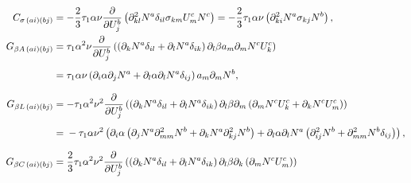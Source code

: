 \begin{align}
  C_{\sigma\, (ai)(bj)}   & = - \frac{2}{3} \tau_1 \alpha \nu \frac{\partial }{\partial U_j^b} \left( \partial_{kl}^2 N^a \delta_{il} \sigma_{km} U_m^c N^c \right) = - \frac{2}{3} \tau_1 \alpha \nu \left( \partial_{ki}^2 N^a \sigma_{kj} N^b \right), \label{eq:CSigmaLHSStabilizationTerm}                                                                       \\
  G_{\beta A \, (ai)(bj)} & = \tau_1 \alpha^2 \nu \frac{\partial }{\partial U_j^b} \left( \left( \partial_k N^a \delta_{il} + \partial_l N^a \delta_{ik} \right) \partial_l \beta a_m \partial_m N^c U_k^c \right) \notag                                                                                                                                             \\
                          & = \vphantom{\frac{\partial }{\partial U_j^b}}\tau_1 \alpha \nu \left(\partial_i \alpha \partial_j N^a + \partial_l \alpha \partial_l N^a \delta_{ij} \right) a_m \partial_m N^b, \label{eq:GBetaALHSStabilizationTerm}                                                                                                                    \\
  G_{\beta L \, (ai)(bj)} & = - \tau_1 \alpha^2 \nu^2 \frac{\partial }{\partial U_j^b} \left( \left( \partial_k N^a \delta_{il} + \partial_l N^a \delta_{ik} \right) \partial_l \beta \partial_m \left( \partial_m N^c U_k^c + \partial_k N^c U_m^c \right) \right) \notag                                                                                            \\
                          & = \vphantom{\frac{\partial }{\partial U_j^b}}- \tau_1 \alpha \nu^2 \left( \partial_i \alpha \left( \partial_j  N^a \partial_{mm}^2 N^b + \partial_k N^a \partial_{kj}^2 N^b \right) + \partial_l \alpha \partial_l N^a \left( \partial_{ij}^2 N^b + \partial_{mm}^2 N^b \delta_{ij} \right)\right), \label{eq:GBetaLLHSStabilizationTerm}                                                                                                                                                                                                                                                       \\
  G_{\beta C \, (ai)(bj)}      & = \frac{2}{3} \tau_1 \alpha^2 \nu^2 \frac{\partial }{\partial U_j^b} \left( \left( \partial_k N^a \delta_{il} + \partial_l N^a \delta_{ik} \right)  \partial_l \beta \partial_k \left( \partial_m N^c U_m^c \right) \right) \notag                                                                                                                                                     \\

\end{align}
